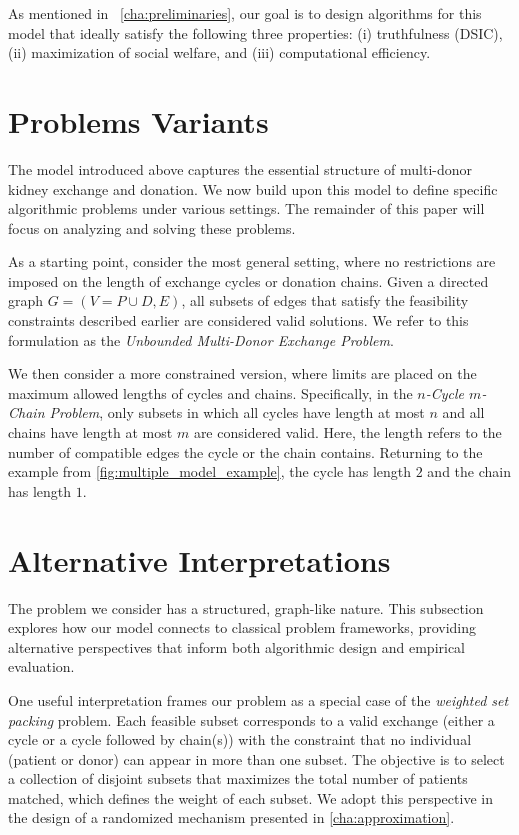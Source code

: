 As mentioned in ~\autoref{cha:preliminaries}, our goal is to design algorithms for this model that ideally satisfy the following three properties:  
(i) truthfulness (DSIC),  
(ii) maximization of social welfare, and  
(iii) computational efficiency.

\section{Problems Variants}

The model introduced above captures the essential structure of multi-donor kidney exchange and donation. We now build upon this model to define specific algorithmic problems under various settings. The remainder of this paper will focus on analyzing and solving these problems.

As a starting point, consider the most general setting, where no restrictions are imposed on the length of exchange cycles or donation chains. Given a directed graph $G = (V = P \cup D, E)$, all subsets of edges that satisfy the feasibility constraints described earlier are considered valid solutions. We refer to this formulation as the \textit{Unbounded Multi-Donor Exchange Problem}.

We then consider a more constrained version, where limits are placed on the maximum allowed lengths of cycles and chains. Specifically, in the \textit{$n$-Cycle $m$-Chain Problem}, only subsets in which all cycles have length at most $n$ and all chains have length at most $m$ are considered valid. Here, the length refers to the number of compatible edges the cycle or the chain contains. Returning to the example from \autoref{fig:multiple_model_example}, the cycle has length $2$ and the chain has length $1$.



\section{Alternative Interpretations}

The problem we consider has a structured, graph-like nature. This subsection explores how our model connects to classical problem frameworks, providing alternative perspectives that inform both algorithmic design and empirical evaluation.

\label{pro:weighted_set_packing}

One useful interpretation frames our problem as a special case of the \emph{weighted set packing} problem. Each feasible subset corresponds to a valid exchange (either a cycle or a cycle followed by chain(s)) with the constraint that no individual (patient or donor) can appear in more than one subset. The objective is to select a collection of disjoint subsets that maximizes the total number of patients matched, which defines the weight of each subset. We adopt this perspective in the design of a randomized mechanism presented in \autoref{cha:approximation}.


